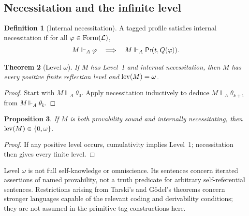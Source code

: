 \documentclass[11pt,letterpaper]{article}
\newtheorem{theorem}{Theorem}[section]\newtheorem{proposition}[theorem]{Proposition}\newtheorem{lemma}[theorem]{Lemma}\newtheorem{corollary}[theorem]{Corollary}\newtheorem{conjecture}[theorem]{Conjecture}\theoremstyle{definition}\newtheorem{definition}[theorem]{Definition}\newtheorem{example}[theorem]{Example}\newtheorem{remark}[theorem]{Remark}
\begin{document}
\subsection{Necessitation and the infinite level}
\begin{definition}[Internal necessitation]
A tagged profile satisfies internal necessitation if for all $\varphi\in\mathrm{Form}(\mathcal L)$,
\[
M\Vdash_A\varphi\quad\Longrightarrow\quad M\Vdash_A\mathsf{Pr}(t,Q(\varphi)).
\]
\end{definition}
\begin{theorem}[Level $\omega$]
If $M$ has Level~1 and internal necessitation, then $M$ has every positive finite reflection level and $\operatorname{lev}(M)=\omega$.
\end{theorem}
\begin{proof}
Start with $M\Vdash_A\theta_0$. Apply necessitation inductively to deduce $M\Vdash_A\theta_{k+1}$ from $M\Vdash_A\theta_k$.
\end{proof}
\begin{proposition}
If $M$ is both provability sound and internally necessitating, then $\operatorname{lev}(M)\in\{0,\omega\}$.
\end{proposition}
\begin{proof}
If any positive level occurs, cumulativity implies Level~1; necessitation then gives every finite level.
\end{proof}
Level $\omega$ is not full self-knowledge or omniscience. Its sentences concern iterated assertions of named provability, not a truth predicate for arbitrary self-referential sentences. Restrictions arising from Tarski's and G\"odel's theorems concern stronger languages capable of the relevant coding and derivability conditions; they are not assumed in the primitive-tag constructions here.
\end{document}
